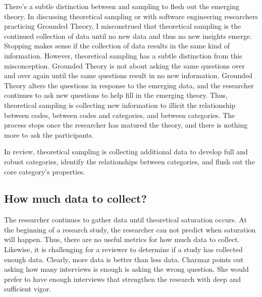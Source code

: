 There’s a subtle distinction between  and sampling to flesh out the emerging theory. In discussing theoretical sampling or  with software engineering researchers practicing Grounded Theory, I misconstrued that theoretical sampling is the continued collection of data until no new data and thus no new insights emerge. Stopping makes sense if the collection of data results in the same kind of information. However, theoretical sampling has a subtle distinction from this misconception. Grounded Theory is not about asking the same questions over and over again until the same questions result in no new information. Grounded Theory alters the questions in response to the emerging data, and the researcher continues to ask new questions to help fill in the emerging theory. Thus, theoretical sampling is collecting new information to illicit the relationship between codes, between codes and categories, and between categories. The process stops once the researcher has matured the theory, and there is nothing more to ask the participants. 



In review, theoretical sampling is collecting additional data to develop full and robust categories, identify the relationships between categories, and flush out the core category's properties.

\subsection{How much data to collect?}
The researcher continues to gather data until theoretical saturation occurs. At the beginning of a research study, the researcher can not predict when saturation will happen. Thus, there are no useful metrics for how much data to collect. Likewise, it is challenging for a reviewer to determine if a study has collected enough data. Clearly, more data is better than less data. Charmaz points out asking how many interviews is enough is asking the wrong question. She would prefer to have enough interviews that strengthen the research with deep and sufficient vigor. 

